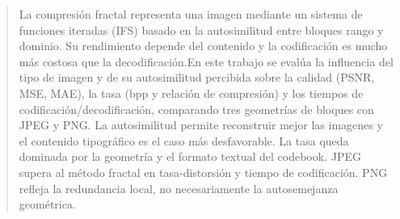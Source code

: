 \begin{abstract}
    La compresión fractal representa una imagen mediante un sistema de funciones iteradas (IFS) basado en la autosimilitud entre bloques rango y dominio. Su rendimiento depende del contenido y la codificación es mucho más costosa que la decodificación.En este trabajo se evalúa la influencia del tipo de imagen y de su autosimilitud percibida sobre la calidad (PSNR, MSE, MAE), la tasa (bpp y relación de compresión) y los tiempos de codificación/decodificación, comparando tres geometrías de bloques con JPEG y PNG. La autosimilitud permite reconstruir mejor las imagenes y el contenido tipográfico es el caso más desfavorable. La tasa queda dominada por la geometría y el formato textual del codebook. JPEG supera al método fractal en tasa-distorsión y tiempo de codificación. PNG refleja la redundancia local, no necesariamente la autosemejanza geométrica.
    \end{abstract}
